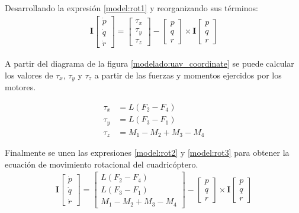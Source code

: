 Desarrollando la expresión \ref{model:rot1} y reorganizando sus términos:
\begin{align}
\mathbf{I}\begin{bmatrix}
	\dot{p}\\
	\dot{q}\\
	\dot{r}
\end{bmatrix}=
\begin{bmatrix}
	\tau_x\\
	\tau_y\\
	\tau_z
\end{bmatrix} -\begin{bmatrix}
	p\\
	q\\
	r
\end{bmatrix} \times\mathbf{I}\begin{bmatrix}
	p\\
	q\\
	r
\end{bmatrix}\label{model:rot2}
\end{align}

A partir del diagrama de la figura \ref{modelado:uav_coordinate} se puede calcular los valores de $\tau_x$, $\tau_y$ y $\tau_z$ a partir de las fuerzas y momentos ejercidos por los motores.

\begin{align}
	\tau_x &=  L (F_2-F_4)\nonumber\\
	\tau_y &=  L (F_3-F_1)\nonumber\\
	\tau_z &=  M_1 - M_2 + M_3 - M_4\label{model:rot3}
\end{align}

Finalmente se unen las expresiones \ref{model:rot2} y \ref{model:rot3} para obtener la ecuación de movimiento rotacional del cuadricóptero.
\begin{align}
	\label{model:rot_eq}
	\mathbf{I}\begin{bmatrix}
		\dot{p}\\
		\dot{q}\\
		\dot{r}
	\end{bmatrix}=\left[
	\begin{array}{c}
		L (F_2-F_4)\\
		L (F_3-F_1)\\
		M_1 - M_2 + M_3 - M_4
	\end{array}\right] -\begin{bmatrix}
		p\\
		q\\
		r
	\end{bmatrix} \times\mathbf{I}\begin{bmatrix}
		p\\
		q\\
		r
	\end{bmatrix}
\end{align}


